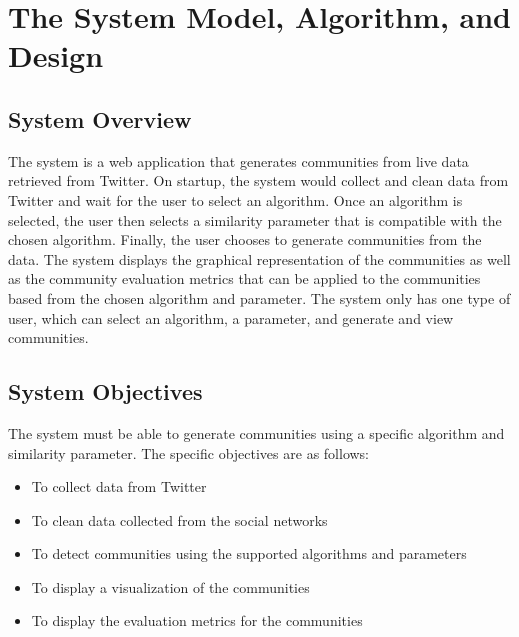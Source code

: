 %
%
%                 

\chapter{The System Model, Algorithm, and Design}
\label{sec:sysmodel}

\section{System Overview}
The system is a web application that generates communities from live data retrieved from Twitter. 
On startup, the system would collect and clean data from Twitter and wait for the user to select 
an algorithm. Once an algorithm is selected, the user then selects a similarity parameter that is compatible
with the chosen algorithm. Finally, the user chooses to generate communities from the data. The system displays 
the graphical representation of the communities as well as the community evaluation metrics that can be applied 
to the communities based from the chosen algorithm and parameter. The system only has one type of user, which 
can select an algorithm, a parameter, and generate and view communities.

\section{System Objectives}
The system must be able to generate communities using a specific algorithm and similarity parameter. The specific objectives are as follows:

\begin{itemize}
	\item To collect data from Twitter
	\item To clean data collected from the social networks
	\item To detect communities using the supported algorithms and parameters
	\item To display a visualization of the communities
	\item To display the evaluation metrics for the communities
\end{itemize}

